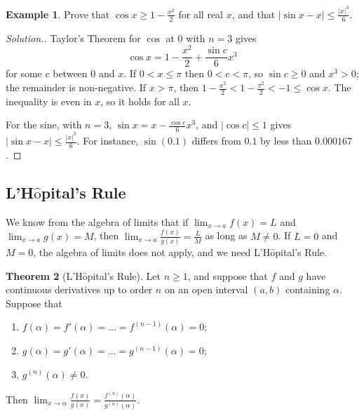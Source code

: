 \documentclass[11pt,a4paper]{article}
\numberwithin{equation}{section}
\theoremstyle{definition}
\newtheorem{thm}{Theorem}[subsection]
\newtheorem{exa}[thm]{Example}
\newenvironment{solution}
  {\renewcommand{\qedsymbol}{}\begin{proof}[\textit{Solution}.]}
  {\end{proof}}
\begin{document}
\begin{exa}
Prove that $\cos x\geq 1 - \frac{x^2}{2}$ for all real $x$, and that $\left|\sin x - x\right|\leq\frac{|x|^3}{6}$.
\end{exa}

\begin{solution}
Taylor's Theorem for $\cos$ at $0$ with $n = 3$ gives
$$\cos x = 1 - \frac{x^2}{2} + \frac{\sin c}{6}x^3$$
for some $c$ between $0$ and $x$. If $0<x\leq\pi$ then $0<c<\pi$, so $\sin c\geq 0$ and $x^3>0$; the remainder is non-negative. If $x>\pi$, then $1 - \frac{x^2}{2}<1-\frac{\pi^2}{2}<-1\leq\cos x$. The inequality is even in $x$, so it holds for all $x$.

For the sine, with $n=3$, $\sin x = x - \frac{\cos c}{6}x^3$, and $|\cos c|\leq 1$ gives $|\sin x - x|\leq\frac{|x|^3}{6}$. For instance, $\sin(0.1)$ differs from $0.1$ by less than $0.000167$.
\end{solution}


\subsection{L'H$\hat{\text{o}}$pital's Rule}

We know from the algebra of limits that if $\lim_{x\rightarrow a} f(x) = L$ and $\lim_{x\rightarrow a} g(x) = M$, then $\lim_{x\rightarrow a} \frac{f(x)}{g(x)} = \frac{L}{M}$ as long as $M\neq 0$. If $L = 0$ and $M = 0$, the algebra of limits does not apply, and we need L'H$\hat{\text{o}}$pital's Rule.


\begin{thm}[L'H$\hat{\text{o}}$pital's Rule]
Let $n\geq1$, and suppose that $f$ and $g$ have continuous derivatives up to order $n$ on an open interval $(a,b)$ containing $\alpha$. Suppose that
\begin{enumerate}
\item[(i)] $f(\alpha) = f'(\alpha) = \dots = f^{(n-1)}(\alpha) = 0$;
\item[(ii)] $g(\alpha) = g'(\alpha) = \dots = g^{(n-1)}(\alpha) = 0$;
\item[(iii)] $g^{(n)}(\alpha) \neq 0$.
\end{enumerate}
Then $\displaystyle\lim_{x\rightarrow \alpha} \frac{f(x)}{g(x)} = \frac{f^{(n)}(\alpha)}{g^{(n)}(\alpha)}$.
\end{thm}
\end{document}
